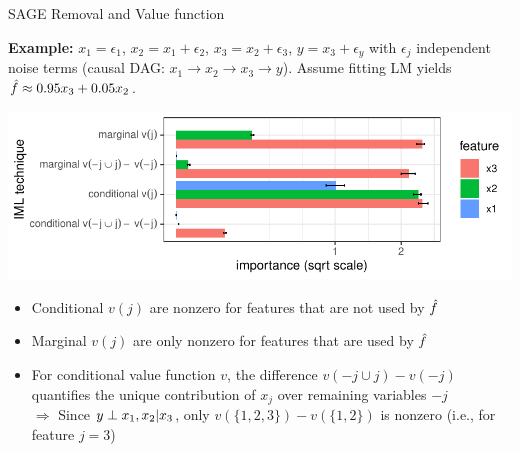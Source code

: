 \documentclass[11pt,compress,t,notes=noshow, aspectratio=169, xcolor=table]{beamer}
\begin{document}
\begin{frame}{SAGE Removal and Value function}

\textbf{Example:} $x_1 = \epsilon_1$, $x_2 = x_1 + \epsilon_2$, $x_3 = x_2 + \epsilon_3$, $y = x_3 + \epsilon_y$ with $\epsilon_j$ independent noise terms (causal DAG: $x_1 \rightarrow x_2 \rightarrow x_3 \rightarrow y$). Assume fitting LM yields $\fh \approx 0.95 x_3 + 0.05 x_2$. 
%
\centerline{\includegraphics[width=0.7\linewidth]{figure_man/sage_variants}}

\begin{itemize}
    \item Conditional $v(j)$ are nonzero for features that are not used by $\fh$
    \item Marginal $v(j)$ are only nonzero for features that are used by $\fh$
    \item For conditional value function $v$, the difference $v(-j \cup j) - v(-j)$ quantifies the unique contribution of $x_j$ over remaining variables $-j$\\
    $\Rightarrow$ Since $y \indep x_1, x_2 | x_3$, only $v(\{1,2,3\}) - v(\{1, 2\})$ is nonzero (i.e., for feature $j = 3$)
\end{itemize}

\end{frame}
\end{document}

